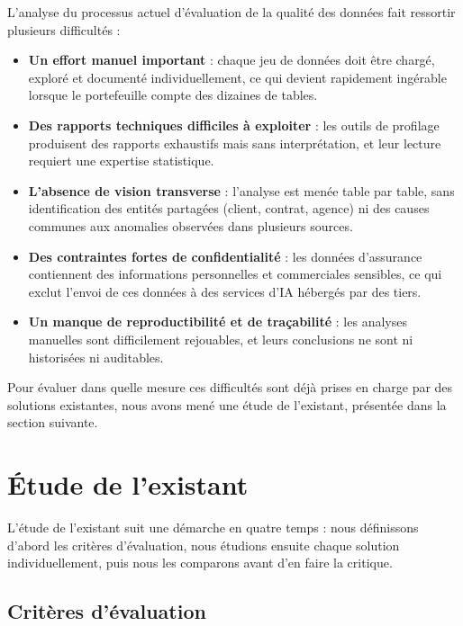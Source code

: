 L'analyse du processus actuel d'évaluation de la qualité des données fait ressortir plusieurs difficultés :
\begin{itemize}
  \item \textbf{Un effort manuel important} : chaque jeu de données doit être chargé, exploré et documenté individuellement, ce qui devient rapidement ingérable lorsque le portefeuille compte des dizaines de tables.
  \item \textbf{Des rapports techniques difficiles à exploiter} : les outils de profilage produisent des rapports exhaustifs mais sans interprétation, et leur lecture requiert une expertise statistique.
  \item \textbf{L'absence de vision transverse} : l'analyse est menée table par table, sans identification des entités partagées (client, contrat, agence) ni des causes communes aux anomalies observées dans plusieurs sources.
  \item \textbf{Des contraintes fortes de confidentialité} : les données d'assurance contiennent des informations personnelles et commerciales sensibles, ce qui exclut l'envoi de ces données à des services d'IA hébergés par des tiers.
  \item \textbf{Un manque de reproductibilité et de traçabilité} : les analyses manuelles sont difficilement rejouables, et leurs conclusions ne sont ni historisées ni auditables.
\end{itemize}

Pour évaluer dans quelle mesure ces difficultés sont déjà prises en charge par des solutions existantes, nous avons mené une étude de l'existant, présentée dans la section suivante.

\section{Étude de l'existant}

L'étude de l'existant suit une démarche en quatre temps : nous définissons d'abord les critères d'évaluation, nous étudions ensuite chaque solution individuellement, puis nous les comparons avant d'en faire la critique.

\subsection{Critères d'évaluation}

